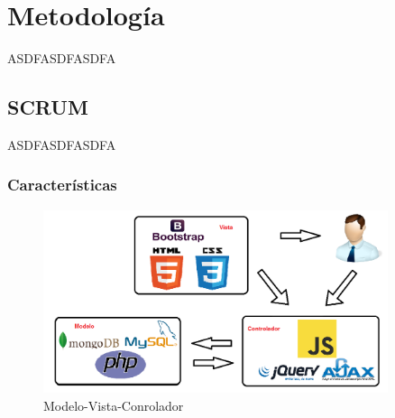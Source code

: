 \section{Metodología}
ASDFASDFASDFA

\subsection{SCRUM}

ASDFASDFASDFA


\subsubsection*{Características}

\begin{figure}[H]
\centering
\includegraphics[width=0.9\textwidth]{Figures/mvc.png}
\caption{Modelo-Vista-Conrolador}
\label{MVC}
\end{figure}


\afterpage{\blankpage}